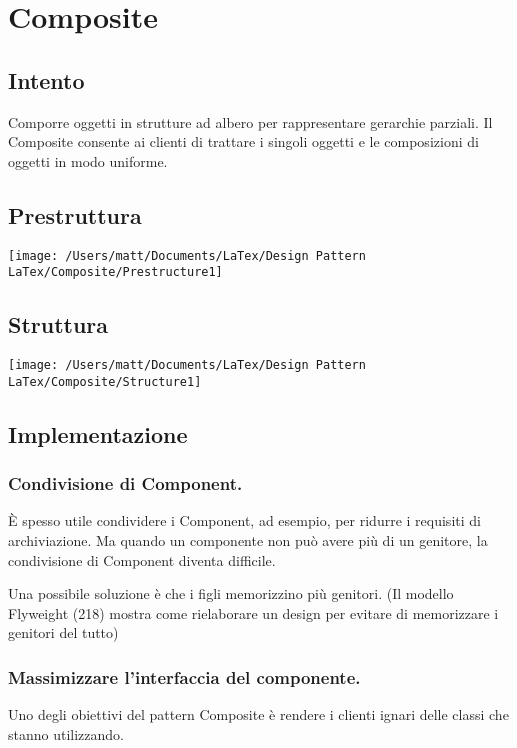 \chapter{Composite}
\section{Intento}

Comporre oggetti in strutture ad albero per rappresentare gerarchie parziali. Il Composite consente ai clienti di trattare i singoli oggetti e le composizioni di oggetti in modo uniforme.


\section{Prestruttura}

\texttt{[image: /Users/matt/Documents/LaTex/Design Pattern LaTex/Composite/Prestructure1]}


\section{Struttura}

\texttt{[image: /Users/matt/Documents/LaTex/Design Pattern LaTex/Composite/Structure1]}


\section{Implementazione}

\subsection{Condivisione di Component.}
È spesso utile condividere i Component, ad esempio, per ridurre i requisiti di archiviazione. Ma quando un componente non può avere più di un genitore, la condivisione di Component diventa difficile.

Una possibile soluzione è che i figli memorizzino più genitori. (Il modello Flyweight (218) mostra come rielaborare un design per evitare di memorizzare i genitori del tutto)

\subsection{Massimizzare l'interfaccia del componente.}
Uno degli obiettivi del pattern Composite è rendere i clienti ignari delle classi che stanno utilizzando.

